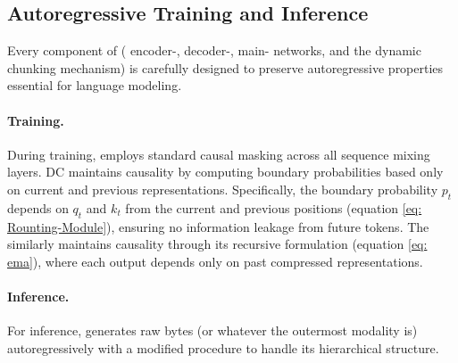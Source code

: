 \subsection{Autoregressive Training and Inference}
\label{sec: Method-Autoregressive-Training-and-Inference}
Every component of \model{} (\ie{} encoder-, decoder-, main- networks, and the dynamic chunking mechanism) is carefully designed to preserve autoregressive properties essential for language modeling.

\paragraph{Training.}
During training, \model{} employs standard causal masking across all sequence mixing layers.
DC maintains causality by computing boundary probabilities based only on current and previous representations.
Specifically, the boundary probability $p_t$ depends on $q_t$ and $k_t$ from the current and previous positions (equation \eqref{eq: Rounting-Module}), ensuring no information leakage from future tokens.
The \smoother{} similarly maintains causality through its recursive formulation (equation \eqref{eq: ema}), where each output depends only on past compressed representations.

\paragraph{Inference.}
For inference, \model{} generates raw bytes (or whatever the outermost modality is) autoregressively with a modified procedure to handle its hierarchical structure.

